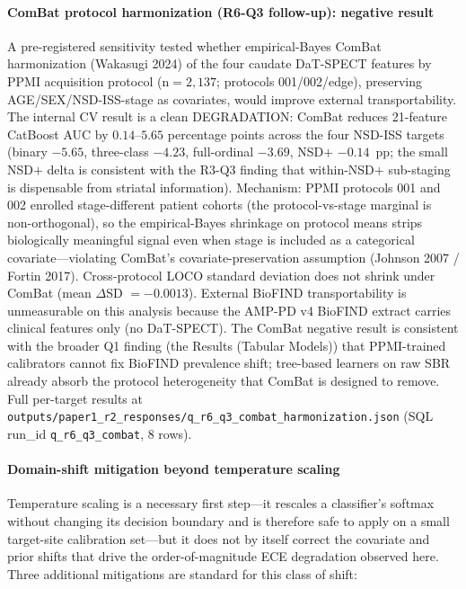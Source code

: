 \documentclass[10pt,letterpaper]{article}
\begin{document}
\paragraph*{ComBat protocol harmonization (R6-Q3 follow-up): negative result} A pre-registered sensitivity tested whether empirical-Bayes ComBat harmonization (Wakasugi 2024) of the four caudate DaT-SPECT features by PPMI acquisition protocol (n${=}2{,}137$; protocols 001/002/edge), preserving AGE/SEX/NSD-ISS-stage as covariates, would improve external transportability. The internal CV result is a clean DEGRADATION: ComBat reduces 21-feature CatBoost AUC by $0.14$--$5.65$ percentage points across the four NSD-ISS targets (binary $-5.65$, three-class $-4.23$, full-ordinal $-3.69$, NSD$+$ $-0.14$~pp; the small NSD$+$ delta is consistent with the R3-Q3 finding that within-NSD$+$ sub-staging is dispensable from striatal information). Mechanism: PPMI protocols 001 and 002 enrolled stage-different patient cohorts (the protocol-vs-stage marginal is non-orthogonal), so the empirical-Bayes shrinkage on protocol means strips biologically meaningful signal even when stage is included as a categorical covariate---violating ComBat's covariate-preservation assumption (Johnson 2007 / Fortin 2017). Cross-protocol LOCO standard deviation does not shrink under ComBat (mean $\Delta$SD $=-0.0013$). External BioFIND transportability is unmeasurable on this analysis because the AMP-PD v4 BioFIND extract carries clinical features only (no DaT-SPECT). The ComBat negative result is consistent with the broader Q1 finding (the Results (Tabular Models)) that PPMI-trained calibrators cannot fix BioFIND prevalence shift; tree-based learners on raw SBR already absorb the protocol heterogeneity that ComBat is designed to remove. Full per-target results at \texttt{outputs/paper1\_r2\_responses/q\_r6\_q3\_combat\_harmonization.json} (SQL run\_id \texttt{q\_r6\_q3\_combat}, 8 rows).

\paragraph*{Domain-shift mitigation beyond temperature scaling} Temperature scaling is a necessary first step---it rescales a classifier's softmax without changing its decision boundary and is therefore safe to apply on a small target-site calibration set---but it does not by itself correct the covariate and prior shifts that drive the order-of-magnitude ECE degradation observed here. Three additional mitigations are standard for this class of shift:
\end{document}
